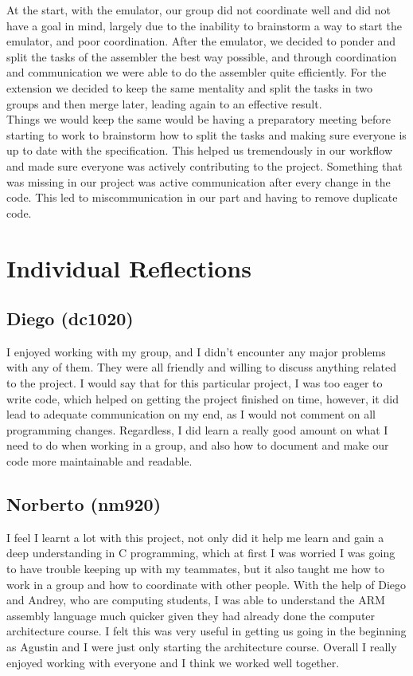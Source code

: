 \documentclass[11pt]{article}
\begin{document}
At the start, with the emulator, our group did not coordinate well and did not have a goal in mind, largely due to the inability to brainstorm a way to start the emulator, and poor coordination. After the emulator, we decided to ponder and split the tasks of the assembler the best way possible, and through coordination and communication we were able to do the assembler quite efficiently. For the extension we decided to keep the same mentality and split the tasks in two groups and then merge later, leading again to an effective result. \\

Things we would keep the same would be having a preparatory meeting before starting to work to brainstorm how to split the tasks and making sure everyone is up to date with the specification. This helped us tremendously in our workflow and made sure everyone was actively contributing to the project. Something that was missing in our project was active communication after every change in the code. This led to miscommunication in our part and having to remove duplicate code.
\section{Individual Reflections}
\subsection{Diego (dc1020)}
I enjoyed working with my group, and I didn't encounter any major problems with any of them. They were all friendly and willing to discuss anything related to the project. I would say that for this particular project, I was too eager to write code, which helped on getting the project finished on time, however, it did lead to adequate communication on my end, as I would not comment on all programming changes. Regardless, I did learn a really good amount on what I need to do when working in a group, and also how to document and make our code more maintainable and readable.
\subsection{Norberto (nm920)}
I feel I learnt a lot with this project, not only did it help me learn and gain a deep understanding in C programming, which at first I was worried I was going to have trouble keeping up with my teammates, but it also taught me how to work in a group and how to coordinate with other people. With the help of Diego and Andrey, who are computing students, I was able to understand the ARM assembly language much quicker given they had already done the computer architecture course. I felt this was very useful in getting us going in the beginning as Agustin and I were just only starting the architecture course. Overall I really enjoyed working with everyone and I think we worked well together. 
\end{document}
